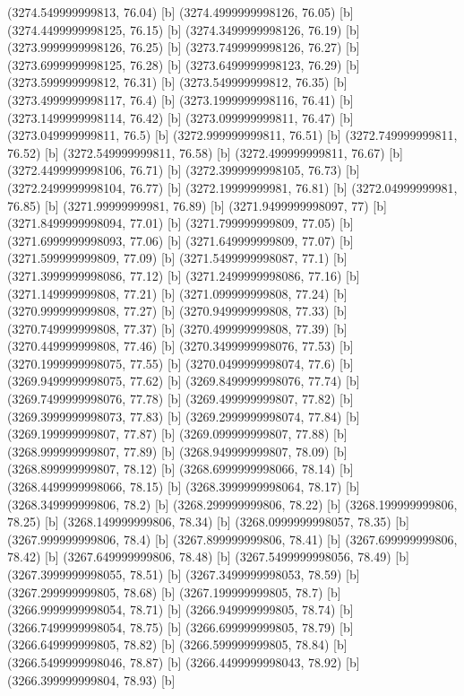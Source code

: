{{{(3274.549999999813, 76.04) [b] 
(3274.4999999998126, 76.05) [b] 
(3274.4499999998125, 76.15) [b] 
(3274.3499999998126, 76.19) [b] 
(3273.9999999998126, 76.25) [b] 
(3273.7499999998126, 76.27) [b] 
(3273.6999999998125, 76.28) [b] 
(3273.6499999998123, 76.29) [b] 
(3273.599999999812, 76.31) [b] 
(3273.549999999812, 76.35) [b] 
(3273.4999999998117, 76.4) [b] 
(3273.1999999998116, 76.41) [b] 
(3273.1499999998114, 76.42) [b] 
(3273.099999999811, 76.47) [b] 
(3273.049999999811, 76.5) [b] 
(3272.999999999811, 76.51) [b] 
(3272.749999999811, 76.52) [b] 
(3272.549999999811, 76.58) [b] 
(3272.499999999811, 76.67) [b] 
(3272.4499999998106, 76.71) [b] 
(3272.3999999998105, 76.73) [b] 
(3272.2499999998104, 76.77) [b] 
(3272.19999999981, 76.81) [b] 
(3272.04999999981, 76.85) [b] 
(3271.99999999981, 76.89) [b] 
(3271.9499999998097, 77) [b] 
(3271.8499999998094, 77.01) [b] 
(3271.799999999809, 77.05) [b] 
(3271.6999999998093, 77.06) [b] 
(3271.649999999809, 77.07) [b] 
(3271.599999999809, 77.09) [b] 
(3271.5499999998087, 77.1) [b] 
(3271.3999999998086, 77.12) [b] 
(3271.2499999998086, 77.16) [b] 
(3271.149999999808, 77.21) [b] 
(3271.099999999808, 77.24) [b] 
(3270.999999999808, 77.27) [b] 
(3270.949999999808, 77.33) [b] 
(3270.749999999808, 77.37) [b] 
(3270.499999999808, 77.39) [b] 
(3270.449999999808, 77.46) [b] 
(3270.3499999998076, 77.53) [b] 
(3270.1999999998075, 77.55) [b] 
(3270.0499999998074, 77.6) [b] 
(3269.9499999998075, 77.62) [b] 
(3269.8499999998076, 77.74) [b] 
(3269.7499999998076, 77.78) [b] 
(3269.499999999807, 77.82) [b] 
(3269.3999999998073, 77.83) [b] 
(3269.2999999998074, 77.84) [b] 
(3269.199999999807, 77.87) [b] 
(3269.099999999807, 77.88) [b] 
(3268.999999999807, 77.89) [b] 
(3268.949999999807, 78.09) [b] 
(3268.899999999807, 78.12) [b] 
(3268.6999999998066, 78.14) [b] 
(3268.4499999998066, 78.15) [b] 
(3268.3999999998064, 78.17) [b] 
(3268.349999999806, 78.2) [b] 
(3268.299999999806, 78.22) [b] 
(3268.199999999806, 78.25) [b] 
(3268.149999999806, 78.34) [b] 
(3268.0999999998057, 78.35) [b] 
(3267.999999999806, 78.4) [b] 
(3267.899999999806, 78.41) [b] 
(3267.699999999806, 78.42) [b] 
(3267.649999999806, 78.48) [b] 
(3267.5499999998056, 78.49) [b] 
(3267.3999999998055, 78.51) [b] 
(3267.3499999998053, 78.59) [b] 
(3267.299999999805, 78.68) [b] 
(3267.199999999805, 78.7) [b] 
(3266.9999999998054, 78.71) [b] 
(3266.949999999805, 78.74) [b] 
(3266.7499999998054, 78.75) [b] 
(3266.699999999805, 78.79) [b] 
(3266.649999999805, 78.82) [b] 
(3266.599999999805, 78.84) [b] 
(3266.5499999998046, 78.87) [b] 
(3266.4499999998043, 78.92) [b] 
(3266.399999999804, 78.93) [b] 
}}}
